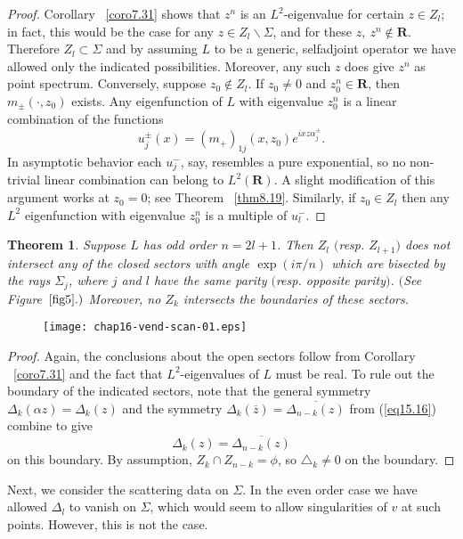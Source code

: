 \documentclass{surv-l}
\theoremstyle{plain}
\newtheorem{theorem}{Theorem}[section]
\theoremstyle{definition}
\numberwithin{equation}{chapter}
\begin{document}
\begin{proof}
Corollary ~\ref{coro7.31} shows that $z^{n}$ is an $L^{2}$-eigenvalue for certain $z\in Z_{l}$; in fact, this would be the case for any $z\in Z_{l}\backslash \Sigma$, and for these $z,\  z^{n}\not\in \mathbf{R}$. Therefore $ Z_{l}\subset\Sigma$ and by assuming $L$ to be a generic, selfadjoint operator we have allowed only the indicated possibilities. Moreover, any such $z$ does give $z^{n}$ as point spectrum. Conversely, suppose $z_{0}\not\in Z_{l}$. If $z_{0}\neq 0$ and $z_{0}^{n}\in \mathbf{R}$, then $m_{\pm}(\cdot, z_{0})$ exists. Any eigenfunction of $L$ with eigenvalue $z_{0}^{n}$ is a linear combination of the functions
\begin{equation}\label{eq16.7}
u_{j}^{\pm}(x)=(m_{+})_{1j}(x, z_{0})e^{ixz\alpha_{j}^{\pm}}.
\end{equation}
In asymptotic behavior each $u_{j}^{-}$, say, resembles a pure exponential, so no non-trivial linear combination can belong to $L^{2}(\mathbf{R})$. A slight modification of this argument works at $z_{0}=0$; see Theorem ~\ref{thm8.19}. Similarly, if $z_{0}\in Z_{l}$ then any $L^{2}$ eigenfunction with eigenvalue $z_{0}^{n}$ is a multiple of $u_{l}^{-}$.
\end{proof}
\setcounter{theorem}{7}
\begin{theorem}\label{thm16.8}
Suppose $L$  has odd order $n=2l+1$.  Then $Z_{l}$ $($resp. $Z_{l+1})$ does not intersect any of the closed sectors with angle $\exp(i\pi/n)$ which are bisected by the rays $\Sigma_{j}$, where $j$ and $l$ have the same parity $($resp. opposite parity$)$. $($See Figure~$\ref{fig5}.)$  Moreover, no $Z_{k}$  intersects the boundaries of these sectors.
\end{theorem}

\begin{figure}
\texttt{[image: chap16-vend-scan-01.eps]}
\caption{}\label{fig5}
\end{figure}

\begin{proof}
Again, the conclusions about the open sectors follow from Corollary ~\ref{coro7.31} and the fact that $L^{2}$-eigenvalues of $L$ must be real. To rule out the boundary of the indicated sectors, note that the general symmetry $\Delta_{k}(\alpha z)=\Delta_{k}(z)$ and the symmetry $\Delta_{k}(\overline{z})=\overline{\Delta_{n-k}(z)}$ from (\ref{eq15.16}) combine to give
\begin{equation*}
\Delta_{k}(z)=\overline{\Delta_{n-k}(z)}
\end{equation*}
on this boundary. By assumption, $Z_{k}\cap Z_{n-k}=\phi$, so $\triangle_{k}\neq 0$ on the boundary. \end{proof}
Next, we consider the scattering data on $\Sigma$. In the even order case we have allowed $\Delta_{l}$ to vanish on $\Sigma$, which would seem to allow singularities of $v$ at such points. However, this is not the case.
\end{document}
